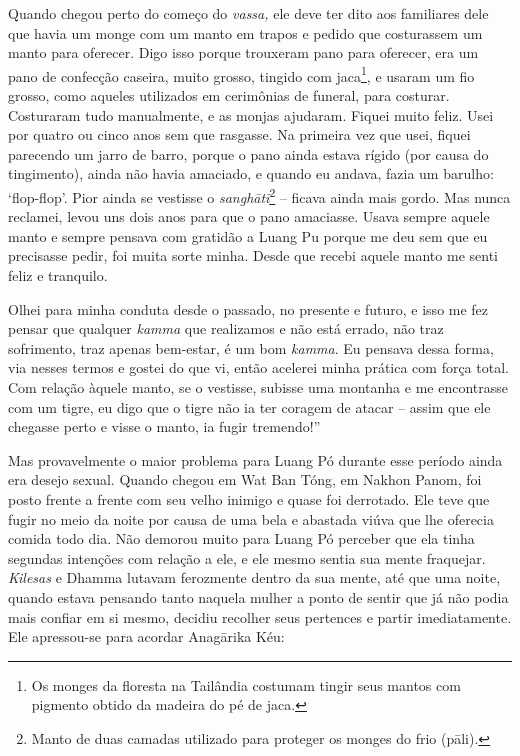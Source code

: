 Quando chegou perto do começo do \emph{vassa,} ele deve ter dito aos
familiares dele que havia um monge com um manto em trapos e pedido que
costurassem um manto para oferecer. Digo isso porque trouxeram pano para
oferecer, era um pano de confecção caseira, muito grosso, tingido com
jaca\footnote{Os monges da floresta na Tailândia costumam tingir seus
  mantos com pigmento obtido da madeira do pé de jaca.}, e usaram um fio
grosso, como aqueles utilizados em cerimônias de funeral, para costurar.
Costuraram tudo manualmente, e as monjas ajudaram. Fiquei muito feliz.
Usei por quatro ou cinco anos sem que rasgasse. Na primeira vez que
usei, fiquei parecendo um jarro de barro, porque o pano ainda estava
rígido (por causa do tingimento), ainda não havia amaciado, e quando eu
andava, fazia um barulho: `flop-flop'. Pior ainda se vestisse o
\emph{sanghātī}\footnote{Manto de duas camadas utilizado para proteger
  os monges do frio (pāli).} -- ficava ainda mais gordo. Mas nunca
reclamei, levou uns dois anos para que o pano amaciasse. Usava sempre
aquele manto e sempre pensava com gratidão a Luang Pu porque me deu sem
que eu precisasse pedir, foi muita sorte minha. Desde que recebi aquele
manto me senti feliz e tranquilo.

Olhei para minha conduta desde o passado, no presente e futuro, e isso
me fez pensar que qualquer \emph{kamma} que realizamos e não está
errado, não traz sofrimento, traz apenas bem-estar, é um bom
\emph{kamma}. Eu pensava dessa forma, via nesses termos e gostei do que
vi, então acelerei minha prática com força total. Com relação àquele
manto, se o vestisse, subisse uma montanha e me encontrasse com um
tigre, eu digo que o tigre não ia ter coragem de atacar -- assim que ele
chegasse perto e visse o manto, ia fugir tremendo!''

Mas provavelmente o maior problema para Luang Pó durante esse período
ainda era desejo sexual. Quando chegou em Wat Ban Tóng, em Nakhon Panom,
foi posto frente a frente com seu velho inimigo e quase foi derrotado.
Ele teve que fugir no meio da noite por causa de uma bela e abastada
viúva que lhe oferecia comida todo dia. Não demorou muito para Luang Pó
perceber que ela tinha segundas intenções com relação a ele, e ele mesmo
sentia sua mente fraquejar. \emph{Kilesas} e Dhamma lutavam ferozmente
dentro da sua mente, até que uma noite, quando estava pensando tanto
naquela mulher a ponto de sentir que já não podia mais confiar em si
mesmo, decidiu recolher seus pertences e partir imediatamente. Ele
apressou-se para acordar Anagārika Kéu:

